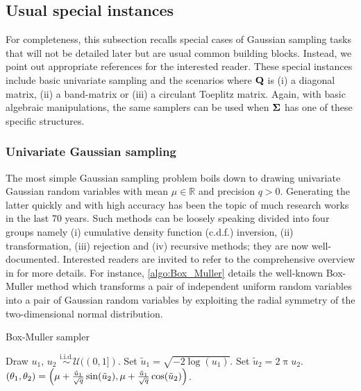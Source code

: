 \documentclass[nohypdvips,onefignum,onetabnum]{siamart171218}
\begin{document}
\subsection{Usual special instances}
\label{subsec:special_instances}
For completeness, this subsection recalls special cases of Gaussian sampling tasks that will not be detailed later but are usual common building blocks.
Instead, we point out appropriate references for the interested reader. These special instances include basic univariate sampling and the scenarios where $\mathbf{Q}$ is (i) a diagonal matrix, (ii) a band-matrix or (iii)  a circulant Toeplitz matrix.
Again, with basic algebraic manipulations, the same samplers can be used when $\mathbf{\Sigma}$ has one of these specific structures.

\subsubsection{Univariate Gaussian sampling}
The most simple Gaussian sampling problem boils down to drawing univariate Gaussian random variables with mean $\mu \in \mathbb{R}$ and precision $q > 0$.
Generating the latter quickly and with high accuracy has been the topic of much research works in the last 70 years.
Such methods can be loosely speaking divided into four groups namely (i) cumulative density function (c.d.f.) inversion, (ii) transformation, (iii) rejection and (iv) recursive methods; they are now well-documented.
Interested readers are invited to refer to the comprehensive overview in \cite{Thomas2007} for more details. For instance, 
\cref{algo:Box_Muller} details the well-known Box-Muller method which transforms a pair of independent uniform random variables into a pair of Gaussian random variables by exploiting the radial symmetry of the two-dimensional normal distribution. 
\begin{algorithm}
  \caption{Box-Muller sampler}
  \label{algo:Box_Muller}
  \begin{algorithmic}[1]
    \State Draw $u_1$, $u_2$ $\overset{\mathrm{i.i.d.}}{\sim} \mathcal{U}((0,1])$.
    \State Set $\tilde{u}_1 = \sqrt{-2\log(u_1)}$.
    \State Set $\tilde{u}_2 = 2\uppi u_2$.\\ 
    \Return $(\theta_1,\theta_2) = \left(\mu + \frac{\tilde{u}_1}{\sqrt{q}} \sin(\tilde{u}_2),\mu + \frac{\tilde{u}_1}{\sqrt{q}} \cos(\tilde{u}_2)\right)$.
  \end{algorithmic}
\end{algorithm}
%
\end{document}
